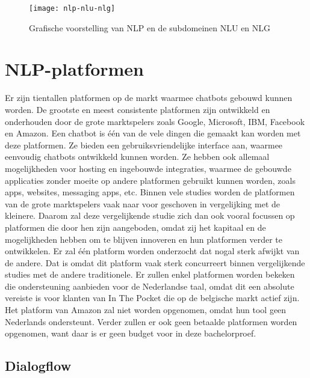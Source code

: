 \begin{figure}[!htbp]
    \label{fig:nlp-nlu-nlg}
    \centering
    \texttt{[image: nlp-nlu-nlg]}
    \caption{Grafische voorstelling van NLP en de subdomeinen NLU en NLG \autocite{Sciforce2019}}
\end{figure}

\section{NLP-platformen}
\label{sec:nlp-platformen}

Er zijn tientallen platformen op de markt waarmee chatbots gebouwd kunnen worden. De grootste en meest consistente platformen zijn ontwikkeld en onderhouden door de grote marktspelers zoals Google, Microsoft, IBM, Facebook en Amazon. Een chatbot is één van de vele dingen die gemaakt kan worden met deze platformen. Ze bieden een gebruiksvriendelijke interface aan, waarmee eenvoudig chatbots ontwikkeld kunnen worden. Ze hebben ook allemaal mogelijkheden voor hosting en ingebouwde integraties, waarmee de gebouwde applicaties zonder moeite op andere platformen gebruikt kunnen worden, zoals apps, websites, messaging apps, etc. Binnen vele studies worden de platformen van de grote marktspelers vaak naar voor geschoven in vergelijking met de kleinere. Daarom zal deze vergelijkende studie zich dan ook vooral focussen op platformen die door hen zijn aangeboden, omdat zij het kapitaal en de mogelijkheden hebben om te blijven innoveren en hun platformen verder te ontwikkelen. Er zal één platform worden onderzocht dat nogal sterk afwijkt van de andere. Dat is omdat dit platform vaak sterk concurreert binnen vergelijkende studies met de andere traditionele. Er zullen enkel platformen worden bekeken die ondersteuning aanbieden voor de Nederlandse taal, omdat dit een absolute vereiste is voor klanten van In The Pocket die op de belgische markt actief zijn. Het platform van Amazon zal niet worden opgenomen, omdat hun tool geen Nederlands ondersteunt. Verder zullen er ook geen betaalde platformen worden opgenomen, want daar is er geen budget voor in deze bachelorproef.

\subsection{Dialogflow}
\label{subsec:nlp-platformen-dialogflow}

